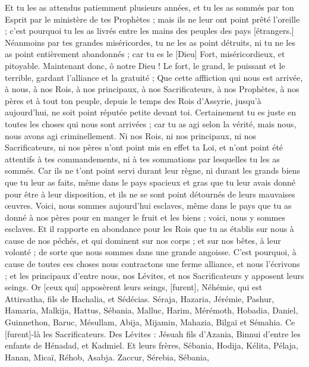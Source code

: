 \begin{multicols}{2}
Et tu les as attendus patiemment plusieurs années, et tu les as sommés par ton Esprit par le ministère de tes Prophètes ; mais ils ne leur ont point prêté l'oreille ; c'est pourquoi tu les as livrés entre les mains des peuples des pays [étrangers.]
Néanmoins par tes grandes miséricordes, tu ne les as point détruits, ni tu ne les as point entièrement abandonnés ; car tu es le [Dieu] Fort, miséricordieux, et pitoyable.
Maintenant donc, ô notre Dieu ! Le fort, le grand, le puissant et le terrible, gardant l'alliance et la gratuité ; Que cette affliction qui nous est arrivée, à nous, à nos Rois, à nos principaux, à nos Sacrificateurs, à nos Prophètes, à nos pères et à tout ton peuple, depuis le temps des Rois d'Assyrie, jusqu'à aujourd'hui, ne soit point réputée petite devant toi.
Certainement tu es juste en toutes les choses qui nous sont arrivées ; car tu as agi selon la vérité, mais nous, nous avons agi criminellement.
Ni nos Rois, ni nos principaux, ni nos Sacrificateurs, ni nos pères n'ont point mis en effet ta Loi, et n'ont point été attentifs à tes commandements, ni à tes sommations par lesquelles tu les as sommés.
Car ils ne t'ont point servi durant leur règne, ni durant les grands biens que tu leur as faits, même dans le pays spacieux et gras que tu leur avais donné pour être à leur disposition, et ils ne se sont point détournés de leurs mauvaises œuvres.
Voici, nous sommes aujourd'hui esclaves, même dans le pays que tu as donné à nos pères pour en manger le fruit et les biens ; voici, nous y sommes esclaves.
Et il rapporte en abondance pour les Rois que tu as établis sur nous à cause de nos péchés, et qui dominent sur nos corps ; et sur nos bêtes, à leur volonté ; de sorte que nous sommes dans une grande angoisse.
C'est pourquoi, à cause de toutes ces choses nous contractons une ferme alliance, et nous l'écrivons ; et les principaux d'entre nous, nos Lévites, et nos Sacrificateurs y apposent leurs seings.
\VerseOne{}Or [ceux qui] apposèrent leurs seings, [furent], Néhémie, qui est Attirsatha, fils de Hachalia, et Sédécias.
Séraja, Hazaria, Jérémie,
Pashur, Hamaria, Malkija,
Hattus, Sébania, Malluc,
Harim, Mérémoth, Hobadia,
Daniel, Guinnethon, Baruc,
Mésullam, Abija, Mijamin,
Mahazia, Bilgaï et Sémahia. Ce [furent]-là les Sacrificateurs.
Des Lévites : Jésuah fils d'Azania, Binnui d'entre les enfants de Hénadad, et Kadmiel.
Et leurs frères, Sébania, Hodija, Kélita, Pélaja, Hanan,
Micaï, Réhob, Asabja.
Zaccur, Sérebia, Sébania,

\end{multicols}
